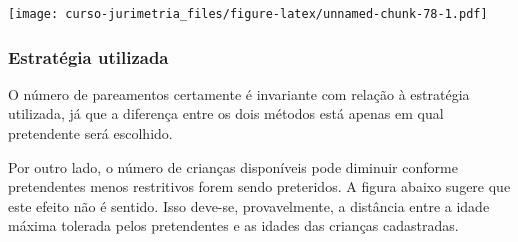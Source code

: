 \documentclass[]{book}
\newenvironment{Shaded}{\begin{snugshade}}{\end{snugshade}}
\newcommand{\KeywordTok}[1]{\textcolor[rgb]{0.13,0.29,0.53}{\textbf{{#1}}}}
\newcommand{\DataTypeTok}[1]{\textcolor[rgb]{0.13,0.29,0.53}{{#1}}}
\newcommand{\DecValTok}[1]{\textcolor[rgb]{0.00,0.00,0.81}{{#1}}}
\newcommand{\StringTok}[1]{\textcolor[rgb]{0.31,0.60,0.02}{{#1}}}
\newcommand{\NormalTok}[1]{{#1}}
\begin{document}
\texttt{[image: curso-jurimetria\_files/figure-latex/unnamed-chunk-78-1.pdf]}

\subsubsection{Estratégia utilizada}\label{estrategia-utilizada}

O número de pareamentos certamente é invariante com relação à estratégia
utilizada, já que a diferença entre os dois métodos está apenas em qual
pretendente será escolhido.

Por outro lado, o número de crianças disponíveis pode diminuir conforme
pretendentes menos restritivos forem sendo preteridos. A figura abaixo
sugere que este efeito não é sentido. Isso deve-se, provavelmente, a
distância entre a idade máxima tolerada pelos pretendentes e as idades
das crianças cadastradas.

\begin{Shaded}
\end{Shaded}
\end{document}
